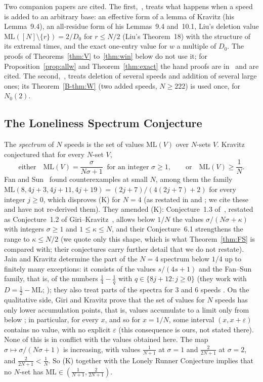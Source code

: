 \documentclass[11pt]{article}
\theoremstyle{definition}
\theoremstyle{remark}
\newcommand{\ML}{\mathrm{ML}}
\newcommand{\xC}[1]{\ref{B-#1}}
\begin{document}
Two companion papers are cited. The first,~\cite{A2}, treats what happens when a speed is added to an arbitrary base: an effective form of a lemma of Kravitz (his Lemma~9.4), an all-residue form of his Lemmas~9.4 and~10.1, Liu's deletion value $\ML([N]\setminus\{r\})=2/D_0$ for $r\le N/2$ (Liu's Theorem~18) with the structure of its extremal times, and the exact one-entry value for $w$ a multiple of $D_0$. The proofs of Theorems~\ref{thm:V} to~\ref{thm:win} below do not use it; for Proposition~\ref{prop:allw} and Theorem~\ref{thm:exact} the hand proofs are in~\cite{A2} and are cited. The second,~\cite{B}, treats deletion of several speeds and addition of several large ones; its Theorem~\xC{thm:W} (two added speeds, $N\ge222$) is used once, for $N_0(2)$.

\subsection{The Loneliness Spectrum Conjecture}\label{sec:kconj}
The \emph{spectrum} of $N$ speeds is the set of values $\ML(V)$ over $N$-sets $V$. Kravitz~\cite[Conj.~1.2, p.~3]{K} conjectured that for every $N$-set $V$,
\[
\text{either}\quad \ML(V)=\frac{\sigma}{N\sigma+1}\ \text{ for an integer }\sigma\ge1,\qquad\text{or}\quad \ML(V)\ge\frac1N.
\tag{K}
\]
Fan and Sun~\cite{FS} found counterexamples at small $N$, among them the family $\ML(8,4j+3,4j+11,4j+19)=(2j+7)/(4(2j+7)+2)$ for every integer $j\ge0$, which disproves (K) for $N=4$ (as restated in \cite[p.~2]{GK} and \cite[(1.2), p.~2]{JK}; we cite these and have not re-derived them). They amended (K): Conjecture~1.3 of~\cite{FS}, restated as Conjecture~1.2 of Giri--Kravitz~\cite[p.~2]{GK}, allows below $1/N$ the values $\sigma/(N\sigma+\kappa)$ with integers $\sigma\ge1$ and $1\le\kappa\le N$, and their Conjecture~6.1 strengthens the range to $\kappa\le N/2$ (we quote only this shape, which is what Theorem~\ref{thm:FS} is compared with; their conjectures carry further detail that we do not restate). Jain and Kravitz determine the part of the $N=4$ spectrum below $1/4$ up to finitely many exceptions: it consists of the values $s/(4s+1)$ and the Fan--Sun family, that is, of the numbers $\frac14-\frac1q$ with $q\in\{8j+12:j\ge0\}$ (they work with $D=\frac12-\ML$; \cite[Thm.~1.3, p.~5]{JK}); they also treat parts of the spectra for $3$ and $6$ speeds \cite[Thms.~1.4, 1.5, p.~5]{JK}. On the qualitative side, Giri and Kravitz prove that the set of values for $N$ speeds has only lower accumulation points, that is, values accumulate to a limit only from below \cite[Thm.~1.4, p.~3]{GK}; in particular, for every $x$, and so for $x=1/N$, some interval $(x,x+\varepsilon)$ contains no value, with no explicit $\varepsilon$ (this consequence is ours, not stated there). None of this is in conflict with the values obtained here. The map $\sigma\mapsto\sigma/(N\sigma+1)$ is increasing, with values $\frac1{N+1}$ at $\sigma=1$ and $\frac2{2N+1}$ at $\sigma=2$, and $\frac2{2N+1}<\frac1N$. So (K) together with the Lonely Runner Conjecture implies that no $N$-set has $\ML\in(\frac1{N+1},\frac2{2N+1})$.
\end{document}
